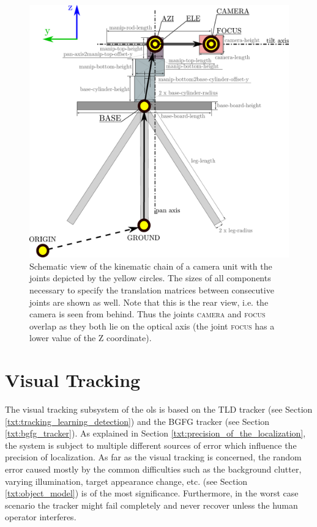 \begin{figure}[htb]
	\centering
	\includegraphics[width=0.6\linewidth]{fig/camera_unit_kinematic_chain.pdf}
	\caption{Schematic view of the kinematic chain of a camera unit with the joints depicted by the yellow circles. The sizes of all components necessary to specify the translation matrices between consecutive joints are shown as well. Note that this is the rear view, i.e. the camera is seen from behind. Thus the joints \textsc{camera} and \textsc{focus} overlap as they both lie on the optical axis (the joint \textsc{focus} has a lower value of the Z coordinate).}
	\label{fig:camera_unit_kinematic_chain}
\end{figure}


\section{Visual Tracking} \label{txt:visual_tracking}

The visual tracking subsystem of the \gls{ols} is based on the TLD tracker (see Section \ref{txt:tracking_learning_detection}) and the BGFG tracker (see Section \ref{txt:bgfg_tracker}). As explained in Section \ref{txt:precision_of_the_localization}, the system is subject to multiple different sources of error which influence the precision of localization. As far as the visual tracking is concerned, the random error caused mostly by the common difficulties such as the background clutter, varying illumination, target appearance change, etc. (see Section \ref{txt:object_model}) is of the most significance. Furthermore, in the worst case scenario the tracker might fail completely and never recover unless the human operator interferes.

